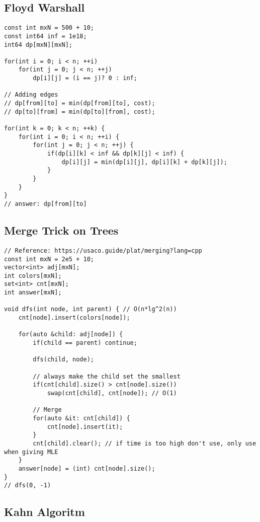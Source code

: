 \documentclass[10pt,letterpaper,twocolumn,twosided]{article}
\begin{document}
\subsection{Floyd Warshall}
\begin{lstlisting}
const int mxN = 500 + 10;
const int64 inf = 1e18;
int64 dp[mxN][mxN];

for(int i = 0; i < n; ++i)
    for(int j = 0; j < n; ++j)
        dp[i][j] = (i == j)? 0 : inf;

// Adding edges
// dp[from][to] = min(dp[from][to], cost);
// dp[to][from] = min(dp[to][from], cost);

for(int k = 0; k < n; ++k) {
    for(int i = 0; i < n; ++i) {
        for(int j = 0; j < n; ++j) {
            if(dp[i][k] < inf && dp[k][j] < inf) {
                dp[i][j] = min(dp[i][j], dp[i][k] + dp[k][j]);
            }
        }
    }
}
// answer: dp[from][to]
\end{lstlisting}

\subsection{Merge Trick on Trees}
\begin{lstlisting}
// Reference: https://usaco.guide/plat/merging?lang=cpp
const int mxN = 2e5 + 10;
vector<int> adj[mxN];
int colors[mxN];
set<int> cnt[mxN];
int answer[mxN];
 
void dfs(int node, int parent) { // O(n*lg^2(n))
    cnt[node].insert(colors[node]);
 
    for(auto &child: adj[node]) {
        if(child == parent) continue;

        dfs(child, node);

        // always make the child set the smallest
        if(cnt[child].size() > cnt[node].size())
            swap(cnt[child], cnt[node]); // O(1)

        // Merge
        for(auto &it: cnt[child]) {
            cnt[node].insert(it);
        }
        cnt[child].clear(); // if time is too high don't use, only use when giving MLE
    }
    answer[node] = (int) cnt[node].size();
}
// dfs(0, -1)
\end{lstlisting}

\subsection{Kahn Algoritm}
\begin{lstlisting}

\end{lstlisting}
\end{document}
